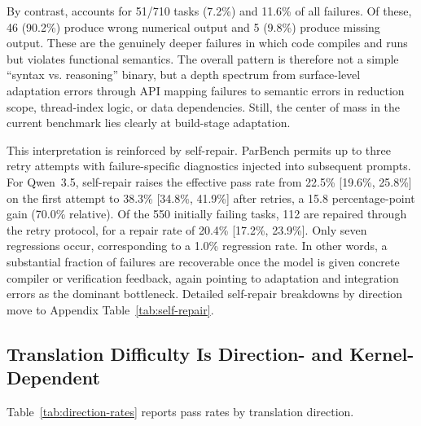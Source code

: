 By contrast, \verifyfail{} accounts for 51/710 tasks (7.2\%) and 11.6\% of all failures. Of these, 46 (90.2\%) produce wrong numerical output and 5 (9.8\%) produce missing output. These are the genuinely deeper failures in which code compiles and runs but violates functional semantics. The overall pattern is therefore not a simple ``syntax vs. reasoning'' binary, but a depth spectrum from surface-level adaptation errors through API mapping failures to semantic errors in reduction scope, thread-index logic, or data dependencies. Still, the center of mass in the current benchmark lies clearly at build-stage adaptation.

This interpretation is reinforced by self-repair. ParBench permits up to three retry attempts with failure-specific diagnostics injected into subsequent prompts. For Qwen~3.5, self-repair raises the effective pass rate from 22.5\% [19.6\%, 25.8\%] on the first attempt to 38.3\% [34.8\%, 41.9\%] after retries, a 15.8 percentage-point gain (70.0\% relative). Of the 550 initially failing tasks, 112 are repaired through the retry protocol, for a repair rate of 20.4\% [17.2\%, 23.9\%]. Only seven regressions occur, corresponding to a 1.0\% regression rate. In other words, a substantial fraction of failures are recoverable once the model is given concrete compiler or verification feedback, again pointing to adaptation and integration errors as the dominant bottleneck. Detailed self-repair breakdowns by direction move to Appendix Table~\ref{tab:self-repair}.

\subsection{Translation Difficulty Is Direction- and Kernel-Dependent}
\label{sec:direction-analysis}

Table~\ref{tab:direction-rates} reports pass rates by translation direction.

